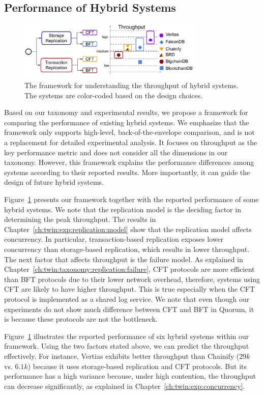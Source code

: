 \subsection{Performance of Hybrid Systems}
\label{ch:twin:exp:hybrids}
\begin{figure}
	\centering
	\includegraphics[width=0.8\textwidth]{diagram/twin/performance_framework.pdf}
	\caption{The framework for understanding the throughput of hybrid systems.
	The systems are color-coded based on the design choices.} 
	\label{diagram:twin:perf_framework}
\end{figure}

Based on our taxonomy and experimental results, we propose a framework for
comparing the performance of existing hybrid systems.
We emphasize that the framework only supports high-level, back-of-the-envelope
comparison, and is not a replacement for detailed experimental analysis.
It focuses on throughput as the key performance metric and does not consider all
the dimensions in our taxonomy.
However, this framework explains the performance differences among systems
according to their reported results.
More importantly, it can guide the design of future hybrid systems.

Figure~\ref{diagram:twin:perf_framework} presents our framework together with the
reported performance of some hybrid systems.
We note that the replication model is the deciding factor in determining the
peak throughput.
The results in Chapter~\ref{ch:twin:exp:replication:model} show that the replication
model affects concurrency.
In particular, transaction-based replication exposes lower concurrency than
storage-based replication, which results in lower throughput.
The next factor that affects throughput is the failure model.
As explained in Chapter~\ref{ch:twin:taxonomy:replication:failure}, CFT protocols
are more efficient than BFT protocols due to their lower network overhead,
therefore, systems using CFT are likely to have higher throughput.
This is true especially when the CFT protocol is implemented as a shared log
service.
We note that even though our experiments do not show much difference between CFT
and BFT in Quorum, it is because these protocols are not the bottleneck.

Figure~\ref{diagram:twin:perf_framework} illustrates the reported performance of six
hybrid systems within our framework.
Using the two factors stated above, we can predict the throughput effectively.
For instance, Vertias exhibits better throughput than Chainify ($29k$ vs.
$6.1k$) because it uses storage-based replication and CFT protocols.
But its performance has a high variance because, under high contention, the
throughput can decrease significantly, as explained in
Chapter~\ref{ch:twin:exp:concurrency}.